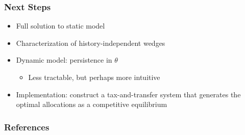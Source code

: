 \documentclass{beamer}
\begin{document}
\begin{frame}
    \frametitle{Next Steps}

    \begin{itemize}
        \item Full solution to static model 
        \item Characterization of history-independent wedges 
        \item Dynamic model: persistence in \( \theta \)
        \begin{itemize}
            \item Less tractable, but perhaps more intuitive
        \end{itemize}
        \item Implementation: construct a tax-and-transfer system that generates the optimal allocations as a competitive equilibrium 
    \end{itemize}

\end{frame}

\begin{frame}[allowframebreaks]
    \frametitle{References}

    
    

\end{frame}
\end{document}
